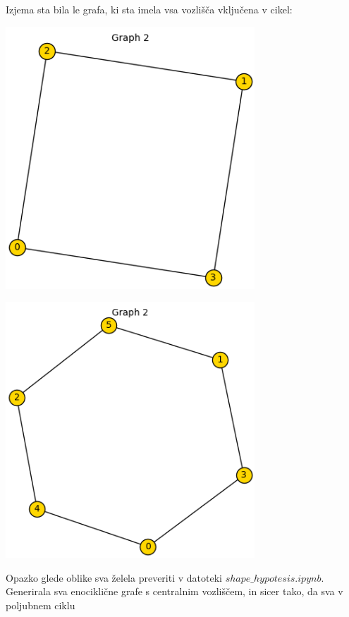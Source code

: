 \documentclass{article}
\begin{document}
Izjema sta bila le grafa, ki sta imela vsa vozlišča vključena v cikel: \\
\begin{minipage}{0.5\textwidth}
    \centering
    \includegraphics[width=0.7\textwidth]{izjema1.png}
\end{minipage}
\begin{minipage}{0.5\textwidth}
    \centering
    \includegraphics[width=0.7\textwidth]{izjema2.png}
\end{minipage}
\par
Opazko glede oblike sva želela preveriti v datoteki $shape\_hypotesis.ipynb$. Generirala sva enociklične grafe s centralnim vozliščem, in sicer tako, da sva v poljubnem ciklu 
\end{document}
